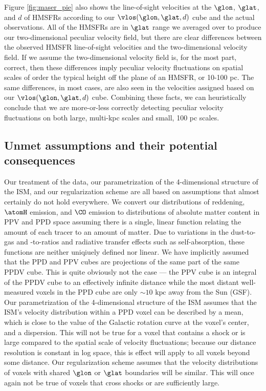 Figure \ref{fig:maser_pie} also shows the line-of-sight velocities at the $\glon$, $\glat$, and $d$ of HMSFRs according to our $\vlos(\glon, \glat, d)$ cube and the actual observations.
All of the HMSFRs are in $\glat$ range we averaged over to produce our two-dimensional peculiar velocity field, but there are clear differences between the observed HMSFR line-of-sight velocities and the two-dimensional velocity field. 
If we assume the two-dimensional velocity field is, for the most part, correct, then these differences imply peculiar velocity fluctuations on spatial scales of order the typical height off the plane of an HMSFR, or 10-100 pc. 
The same differences, in most cases, are also seen in the velocities assigned based on our $\vlos(\glon, \glat, d)$ cube. 
Combining these facts, we can heuristically conclude that we are more-or-less correctly detecting peculiar velocity fluctuations on both large, multi-kpc scales and small, 100 pc scales. 

\subsection{Unmet assumptions and their potential consequences}
\label{sec:discussion-systematics}
Our treatment of the data, our parametrization of the 4-dimensional structure of the ISM, and our regularization scheme are all based on assumptions that almost certainly do not hold everywhere. 
We convert our distributions of reddening, $\atomH$ emission, and $\CO$ emission to distributions of absolute matter content in PPV and PPD space assuming there is a single, linear function relating the amount of each tracer to an amount of matter.
Due to variations in the dust-to-gas and \CO-to-\molH ratios and radiative transfer effects such as self-absorption, these functions are neither uniqiuely defined nor linear. 
We have implicitly assumed that the PPD and PPV cubes are projections of the same part of the same PPDV cube. 
This is quite obviously not the case --- the PPV cube is an integral of the PPDV cube to an effectively infinite distance while the most distant well-measured voxels in the PPD cube are only $\sim 10 \text{ kpc}$ away from the Sun (GSF).
Our parametrization of the 4-dimensional structure of the ISM assumes that the ISM's velocity distribution within a PPD voxel can be described by a mean, which is close to the value of the Galactic rotation curve at the voxel's center, and a dispersion.  
This will not be true for a voxel that contains a shock or is large compared to the spatial scale of velocity fluctuations; because our distance resolution is constant in log space, this is effect will apply to all voxels beyond some distance. 
Our regularization scheme assumes that the velocity distributions of voxels with shared $\glon$ or $\glat$ boundaries will be similar. 
This will once again not be true of voxels that cross shocks or are sufficiently large. 


